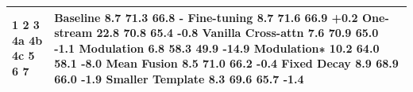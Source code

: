 \begin{tabular}{ll}
\toprule
1 2 3 4a 4b 4c 5 6 7 & Baseline 8.7 71.3 66.8 - Fine-tuning 8.7 71.6 66.9 +0.2 One-stream 22.8 70.8 65.4 -0.8 Vanilla Cross-attn 7.6 70.9 65.0 -1.1 Modulation 6.8 58.3 49.9 -14.9 Modulation∗ 10.2 64.0 58.1 -8.0 Mean Fusion 8.5 71.0 66.2 -0.4 Fixed Decay 8.9 68.9 66.0 -1.9 Smaller Template 8.3 69.6 65.7 -1.4 \\
\midrule
\bottomrule
\end{tabular}
